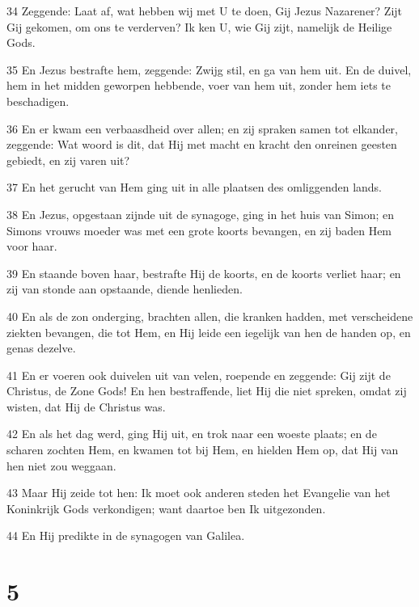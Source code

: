 \par 34 Zeggende: Laat af, wat hebben wij met U te doen, Gij Jezus Nazarener? Zijt Gij gekomen, om ons te verderven? Ik ken U, wie Gij zijt, namelijk de Heilige Gods.
\par 35 En Jezus bestrafte hem, zeggende: Zwijg stil, en ga van hem uit. En de duivel, hem in het midden geworpen hebbende, voer van hem uit, zonder hem iets te beschadigen.
\par 36 En er kwam een verbaasdheid over allen; en zij spraken samen tot elkander, zeggende: Wat woord is dit, dat Hij met macht en kracht den onreinen geesten gebiedt, en zij varen uit?
\par 37 En het gerucht van Hem ging uit in alle plaatsen des omliggenden lands.
\par 38 En Jezus, opgestaan zijnde uit de synagoge, ging in het huis van Simon; en Simons vrouws moeder was met een grote koorts bevangen, en zij baden Hem voor haar.
\par 39 En staande boven haar, bestrafte Hij de koorts, en de koorts verliet haar; en zij van stonde aan opstaande, diende henlieden.
\par 40 En als de zon onderging, brachten allen, die kranken hadden, met verscheidene ziekten bevangen, die tot Hem, en Hij leide een iegelijk van hen de handen op, en genas dezelve.
\par 41 En er voeren ook duivelen uit van velen, roepende en zeggende: Gij zijt de Christus, de Zone Gods! En hen bestraffende, liet Hij die niet spreken, omdat zij wisten, dat Hij de Christus was.
\par 42 En als het dag werd, ging Hij uit, en trok naar een woeste plaats; en de scharen zochten Hem, en kwamen tot bij Hem, en hielden Hem op, dat Hij van hen niet zou weggaan.
\par 43 Maar Hij zeide tot hen: Ik moet ook anderen steden het Evangelie van het Koninkrijk Gods verkondigen; want daartoe ben Ik uitgezonden.
\par 44 En Hij predikte in de synagogen van Galilea.

\chapter{5}


